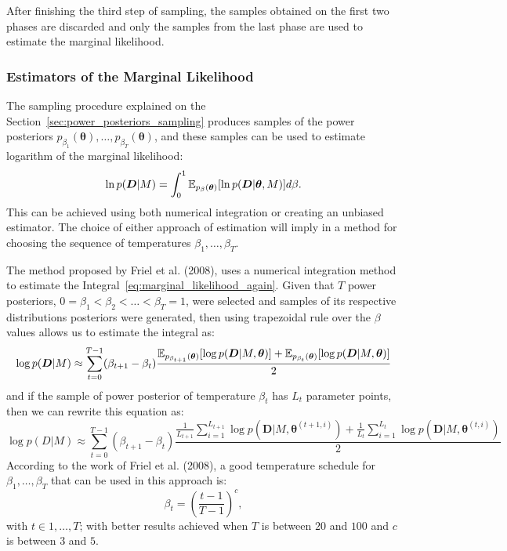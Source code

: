 After finishing the third step of sampling, the samples obtained on the
first two phases are discarded and only the samples from the last phase
are used to estimate the marginal likelihood.

\subsubsection{Estimators of the Marginal Likelihood}
The sampling procedure explained on the 
Section~\ref{sec:power_posteriors_sampling} produces samples of the 
power posteriors $p_{\beta_1} ({\bm \theta}), \ldots, p_{\beta_T} ({\bm
\theta})$, and these samples can be used to estimate logarithm of the 
marginal likelihood:
\begin{equation}
    \ln p ({\bm D} | M) = \int_0^1 \mathbb{E}_{p_\beta ({\bm \theta})} 
        [\ln p({\bm D}|{\bm \theta}, M)]d\beta.
    \label{eq:marginal_likelihood_again}
\end{equation}
This can be achieved using both numerical integration or creating an
unbiased estimator. The choice of either approach of estimation will
imply in a method for choosing the sequence of temperatures $\beta_1, 
\ldots, \beta_T$. 

The method proposed by Friel et al. (2008), uses a numerical integration 
method to estimate the Integral~\ref{eq:marginal_likelihood_again}. 
Given that $T$ power posteriors, $0 = \beta_1 < \beta_2 < \ldots <
\beta_T = 1$, were selected and samples of its respective distributions
posteriors were generated, then using trapezoidal rule over the $\beta$
values allows us to estimate the integral as:
\begin{equation*}
    \log{p({\bm D}| M)} \approx \sum_{t = 0}^{T - 1} (\beta_{t + 1} -
    \beta_t)
\frac{
    \mathbb{E}_{p_{\beta_{t + 1}} ({\bm \theta})}[\log p({\bm D} | M,
    {\bm \theta})]
+ 
    \mathbb{E}_{p_{\beta_{t}} ({\bm \theta})}[\log p({\bm D} | M,
    {\bm \theta})]}
{2}
\end{equation*}
and if the sample of power posterior of temperature $\beta_t$ has $L_t$
parameter points, then we can rewrite this equation as:
\begin{equation}
\log{p(D| M)} \approx \sum_{t = 0}^{T - 1} (\beta_{t + 1} - \beta_t)
\frac{
    \frac{1}{L_{t + 1}}
    \sum_{i = 1}^{L_{t + 1}}  \log p({\bm D} | M, {\bm \theta}^{(t + 1,
    i)})
+ 
    \frac{1}{L_t}
    \sum_{i = 1}^{L_t}  \log p({\bm D} | M, {\bm \theta}^{(t, i)})}
{2}
\end{equation}
According to the work of Friel et al. (2008), a good temperature 
schedule for $\beta_1, \ldots, \beta_T$ that can be used in this 
approach is:
\begin{equation*}
    \beta_t = \left(\frac{t - 1}{T - 1}\right)^{c}, 
\end{equation*}
with $t \in {1, \ldots, T}$; with better results achieved when $T$ is
between $20$ and $100$ and $c$ is between $3$ and $5$.

